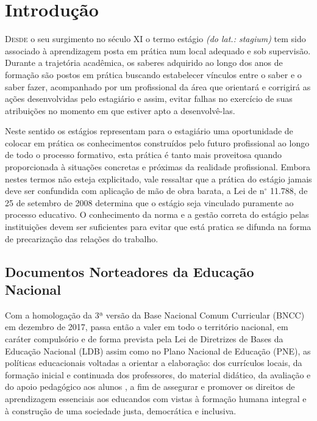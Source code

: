 
\chapter{Introdução}
\lettrine{D}{esde} o seu surgimento no século XI o termo estágio \emph{(do lat.: stagium)} tem sido associado à aprendizagem posta em prática num local adequado e sob supervisão. Durante a trajetória acadêmica, os saberes adquirido ao longo dos anos de formação são postos em prática buscando estabelecer vínculos entre o saber e o saber fazer, acompanhado por um profissional da área que orientará e corrigirá as ações desenvolvidas pelo estagiário e assim, evitar falhas no exercício de suas atribuições no momento em que estiver apto a desenvolvê-las.

Neste sentido os estágios representam para o estagiário uma oportunidade de colocar em prática os conhecimentos construídos pelo futuro profissional ao longo de todo o processo formativo, esta prática é tanto mais proveitosa quando proporcionada à situações concretas e próximas da realidade profissional. Embora nestes termos não esteja explicitado, vale ressaltar que a prática do estágio jamais deve ser confundida com aplicação de mão de obra barata, a Lei de n$^\circ$ 11.788, de 25 de setembro de 2008 determina que o estágio seja vinculado puramente ao processo educativo. O conhecimento da norma e a gestão correta do estágio pelas instituições devem ser suficientes para evitar que está pratica se difunda na forma de precarização das relações do trabalho.

\section{Documentos Norteadores da Educação Nacional}
Com a homologação da 3ª versão da Base Nacional Comum Curricular (BNCC) em dezembro de 2017, passa então a valer em todo o território nacional, em caráter compulsório e de forma prevista pela Lei de Diretrizes de Bases da Educação Nacional (LDB) assim como no Plano Nacional de Educação (PNE), as políticas educacionais voltadas a orientar a elaboração: dos currículos locais, da formação inicial e continuada dos professores, do material didático, da avaliação e do apoio pedagógico aos alunos \cite{BRASIL:2017}, a fim de assegurar e promover os direitos de aprendizagem essenciais aos educandos com vistas à formação humana integral e à construção de uma sociedade justa, democrática e inclusiva.

